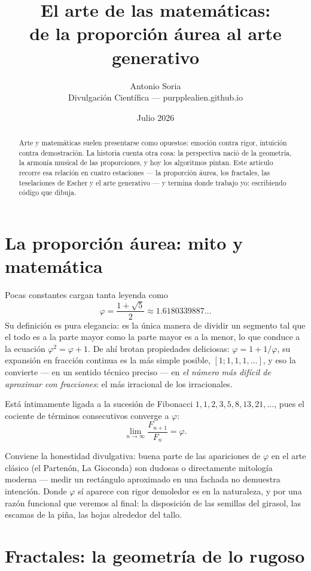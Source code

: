 \documentclass[11pt]{article}
\title{\textbf{El arte de las matemáticas:\\de la proporción áurea al arte generativo}}
\author{Antonio Soria\\ \small{Divulgación Científica — purpplealien.github.io}}
\date{Julio 2026}
\begin{document}
\maketitle

\begin{abstract}
Arte y matemáticas suelen presentarse como opuestos: emoción contra rigor, intuición contra
demostración. La historia cuenta otra cosa: la perspectiva nació de la geometría, la armonía
musical de las proporciones, y hoy los algoritmos pintan. Este artículo recorre esa relación
en cuatro estaciones --- la proporción áurea, los fractales, las teselaciones de Escher y el
arte generativo --- y termina donde trabajo yo: escribiendo código que dibuja.
\end{abstract}

\section{La proporción áurea: mito y matemática}

Pocas constantes cargan tanta leyenda como
\[
\varphi = \frac{1 + \sqrt{5}}{2} \approx 1.6180339887\ldots
\]
Su definición es pura elegancia: es la única manera de dividir un segmento tal que el todo es
a la parte mayor como la parte mayor es a la menor, lo que conduce a la ecuación
$\varphi^2 = \varphi + 1$. De ahí brotan propiedades deliciosas: $\varphi = 1 + 1/\varphi$,
su expansión en fracción continua es la más simple posible, $[1;1,1,1,\ldots]$, y eso la
convierte --- en un sentido técnico preciso --- en \emph{el número más difícil de aproximar
con fracciones}: el más irracional de los irracionales.

Está íntimamente ligada a la sucesión de Fibonacci $1, 1, 2, 3, 5, 8, 13, 21, \ldots$, pues
el cociente de términos consecutivos converge a $\varphi$:
\[
\lim_{n \to \infty} \frac{F_{n+1}}{F_n} = \varphi.
\]

Conviene la honestidad divulgativa: buena parte de las apariciones de $\varphi$ en el arte
clásico (el Partenón, La Gioconda) son dudosas o directamente mitología moderna --- medir un
rectángulo aproximado en una fachada no demuestra intención. Donde $\varphi$ sí aparece con
rigor demoledor es en la naturaleza, y por una razón funcional que veremos al final: la
disposición de las semillas del girasol, las escamas de la piña, las hojas alrededor del
tallo.

\section{Fractales: la geometría de lo rugoso}
\end{document}
